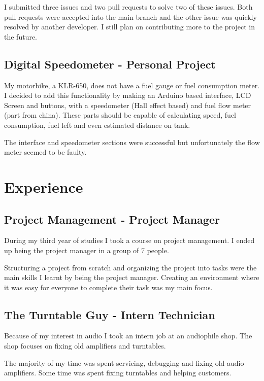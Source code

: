 \documentclass[twocolumn, 8pt]{extarticle}
\begin{document}
I submitted three issues and two pull requests to solve two
of these issues. Both pull requests were accepted into the
main branch and the other issue was quickly resolved by
another developer. I still plan on contributing more to the
project in the future.

\subsection{Digital Speedometer - Personal Project}

My motorbike, a KLR-650, does not have a fuel gauge or fuel
consumption meter. I decided to add this functionality by
making an Arduino based interface, LCD Screen and
buttons, with a speedometer (Hall effect based) and fuel
flow meter (part from china). These parts should be capable
of calculating speed, fuel consumption, fuel left and even
estimated distance on tank.

The interface and speedometer sections were successful
but unfortunately the flow meter seemed to be faulty.

\newpage
\section{Experience}

\subsection{Project Management - Project Manager}

During my third year of studies I took a course on project
management. I ended up being the project manager in a
group of 7 people.

Structuring a project from scratch and organizing the project
into tasks were the main skills I learnt by being the project
manager. Creating an environment where it was easy for
everyone to complete their task was my main focus.

\subsection{The Turntable Guy - Intern Technician}

Because of my interest in audio I took an intern job at an
audiophile shop. The shop focuses on fixing old amplifiers
and turntables.

The majority of my time was spent servicing, debugging and
fixing old audio amplifiers. Some time was spent fixing
turntables and helping customers.
\end{document}
